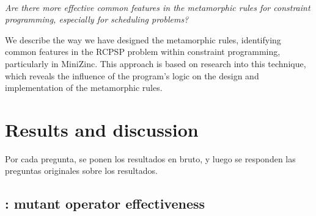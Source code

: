 \paragraph{\rqidentifying}
\emph{Are there more effective common features in the metamorphic
  rules for constraint programming, especially for scheduling
  problems?}

We describe the way we have designed the metamorphic rules,
identifying common features in the RCPSP problem within constraint
programming, particularly in MiniZinc. This approach is based on
research into this technique, which reveals the influence of the
program's logic on the design and implementation of the metamorphic
rules.




\iffalse

Explicar cómo se van a responder esas research questions: programas MiniZinc seleccionados, conjuntos de pruebas iniciales seleccionados, cuántos mutantes salen de esos programas y cuántos son equivalentes (explicando cómo se detectaron los equivalentes), qué se va a medir (mutantes muertos por el conjunto inicial y por las pruebas producidas por las reglas metamórficas).

\fi



\section{Results and discussion}

Por cada pregunta, se ponen los resultados en bruto, y luego se responden las preguntas originales sobre los resultados.

\subsection{\rqoperators: mutant operator effectiveness}

